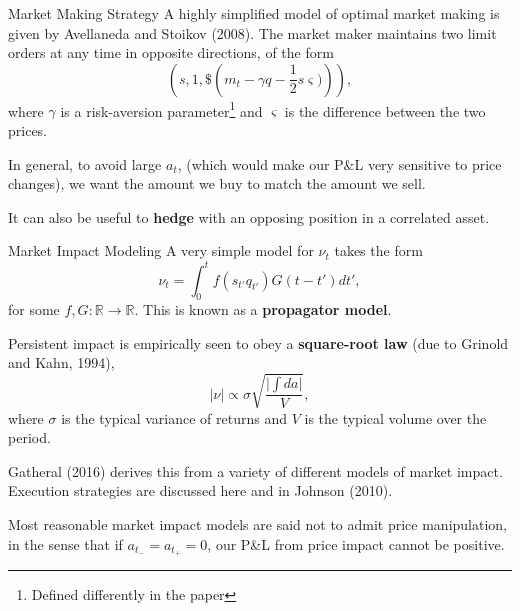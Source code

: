 \documentclass{beamer}
\begin{document}
\begin{frame}{Market Making Strategy}
	A highly simplified model of optimal market making is given by Avellaneda and Stoikov (2008). The market maker maintains two limit orders at any time in opposite directions, of the form
	$$\left(s, 1, \$\left(m_t - \gamma q - \frac{1}{2}s\varsigma)\right)\right),$$
	where $\gamma$ is a risk-aversion parameter\footnote{Defined differently in the paper} and $\varsigma$ is the difference between the two prices.

	In general, to avoid large $a_t$, (which would make our P\&L very sensitive to price changes), we want the amount we buy to match the amount we sell. %

	It can also be useful to \textbf{hedge} with an opposing position in a correlated asset.
\end{frame}

\begin{frame}{Market Impact Modeling}
	A very simple model for $\nu_t$ takes the form
	$$\nu_t = \int_0^t f(s_{t'}q_{t'})G(t-t')dt',$$
	for some $f,G:\mathbb{R}\to\mathbb{R}$. This is known as a \textbf{propagator model}.

	Persistent impact is empirically seen to obey a \textbf{square-root law} (due to Grinold and Kahn, 1994),
	$$\vert\nu\vert \propto \sigma\sqrt{\frac{\vert \int da\vert}{V}},$$
	where $\sigma$ is the typical variance of returns and $V$ is the typical volume over the period.

	Gatheral (2016) derives this from a variety of different models of market impact. Execution strategies are discussed here and in Johnson (2010).%

	Most reasonable market impact models are said not to admit price manipulation, in the sense that if $a_{t_-}=a_{t_+}=0$, our P\&L from price impact cannot be positive.
\end{frame}
\end{document}

